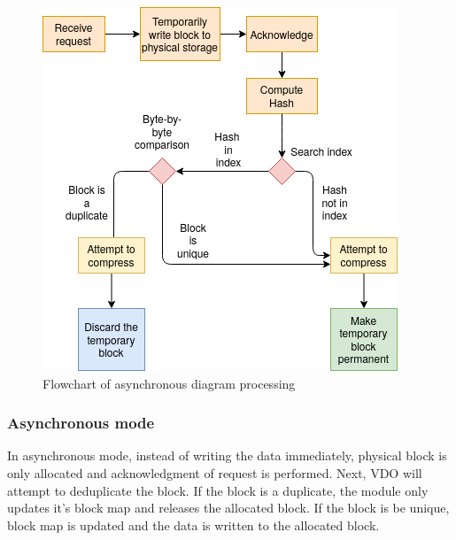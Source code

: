 \documentclass[
  color, %
  table, %
  lof,   %
  lot,   %
]{fithesis3}
\begin{document}
\begin{figure}[!htb]
        \centering
        \includegraphics[width=\textwidth]{graphics/diagrams/sync.png}
\caption[Synchronous write mode]{Flowchart of asynchronous diagram processing}
\label{fig:sync}
\end{figure}

\subsubsection{Asynchronous mode}
In asynchronous mode, instead of writing the data immediately, physical block is only allocated and acknowledgment of request is performed. Next, VDO will attempt to deduplicate the block. If the block is a duplicate, the module only updates it's block map and releases the allocated block. If the block is be unique, block map is updated and the data is written to the allocated block.
\end{document}
